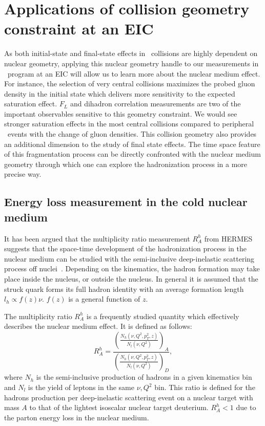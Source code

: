 \section{Applications of collision geometry constraint at an EIC}\label{sec:application}

As both initial-state and final-state effects in \eA\ collisions are highly dependent
on nuclear geometry, applying this nuclear geometry handle to our
measurements in \eA\ program at an EIC will allow us to learn more
about the nuclear medium effect. For instance, the selection of very
central collisions maximizes the probed gluon density in the initial state which
delivers more sensitivity to the expected saturation effect. $F_{L}$ and dihadron
correlation measurements are two of the important observables sensitive to this
geometry constraint. We would see stronger saturation effects in the most
central collisions compared to peripheral \eA\ events with the change of
gluon densities. This collision geometry also provides an additional dimension to
the study of final state effects. The time space feature of this fragmentation
process can be directly confronted with the nuclear medium geometry through
which one can explore the hadronization process in a more precise way.


\subsection{Energy loss measurement in the cold nuclear medium}
It has been argued that the multiplicity ratio measurement $R^{h}_{A}$ from
HERMES suggests that the space-time development of the hadronization process in
the nuclear medium can be studied with the semi-inclusive deep-inelastic
scattering process off nuclei~\cite{Airapetian:2003mi,Airapetian:2007vu,Airapetian:2011jp}. Depending on the
kinematics, the hadron formation may take place inside the nucleus, or
outside the nucleus. In general it is assumed that the struck quark forms its
full hadron identity with an average formation length $l_{h}\propto f(z)\nu$. $f(z)$ is a general function of $z$.

The multiplicity ratio $R^{h}_{A}$ is a frequently studied quantity
which effectively describes the nuclear medium effect. It is defined as follows:
\begin{equation}
R^{h}_{A}=\frac{(\frac{N_{h}(\nu,Q^{2},p^{2}_{T},z)}{N_{l}(\nu,Q^{2})})_{A}}{(\frac{N_{h}(\nu,Q^{2},p^{2}_{T},z)}{N_{l}(\nu,Q^{2})})_{D}},
\end{equation}
where $N_{h}$ is the semi-inclusive production of hadrons in a given kinematics
bin and $N_{l}$ is the yield of leptons in the same $\nu,Q^{2}$ bin. This ratio
is defined for the hadrons production per deep-inelastic scattering event on a
nuclear target with mass $A$ to that of the lightest isoscalar nuclear target
deuterium. $R^{h}_{A}<1$ due to the parton energy loss in the nuclear medium.

